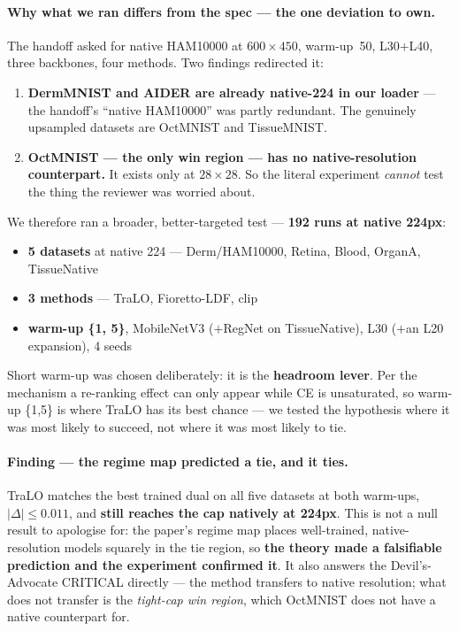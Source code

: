 \documentclass[11pt,a4paper]{article}
\begin{document}
\paragraph{Why what we ran differs from the spec --- the one deviation to own.} The handoff asked
for native HAM10000 at $600\times450$, warm-up~50, L30$+$L40, three backbones, four methods. Two
findings redirected it:

\begin{enumerate}
\item \textbf{DermMNIST and AIDER are already native-224 in our loader} --- the handoff's ``native
      HAM10000'' was partly redundant. The genuinely upsampled datasets are OctMNIST and
      TissueMNIST.
\item \textbf{OctMNIST --- the only win region --- has no native-resolution counterpart.} It exists
      only at $28\times28$. So the literal experiment \emph{cannot} test the thing the reviewer was
      worried about.
\end{enumerate}

We therefore ran a broader, better-targeted test --- \textbf{192 runs at native 224px}:

\begin{itemize}
\item \textbf{5 datasets} at native 224 --- Derm/HAM10000, Retina, Blood, OrganA, TissueNative
\item \textbf{3 methods} --- TraLO, Fioretto-LDF, clip
\item \textbf{warm-up \{1, 5\}}, MobileNetV3 ($+$RegNet on TissueNative), L30 ($+$an L20
      expansion), 4 seeds
\end{itemize}

Short warm-up was chosen deliberately: it is the \textbf{headroom lever}. Per the mechanism a
re-ranking effect can only appear while CE is unsaturated, so warm-up \{1,5\} is where TraLO has
its best chance --- we tested the hypothesis where it was most likely to succeed, not where it was
most likely to tie.

\paragraph{Finding --- the regime map predicted a tie, and it ties.} TraLO matches the best trained
dual on all five datasets at both warm-ups, $|\Delta| \le 0.011$, and \textbf{still reaches the cap
natively at 224px}. This is not a null result to apologise for: the paper's regime map places
well-trained, native-resolution models squarely in the tie region, so \textbf{the theory made a
falsifiable prediction and the experiment confirmed it}. It also answers the Devil's-Advocate
CRITICAL directly --- the method transfers to native resolution; what does not transfer is the
\emph{tight-cap win region}, which OctMNIST does not have a native counterpart for.
\end{document}
